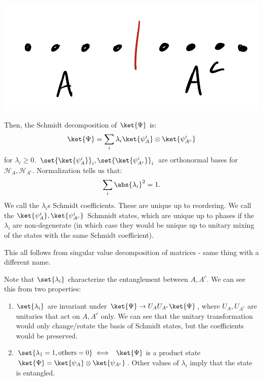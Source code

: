 \begin{center}
    \includegraphics[scale=0.35]{Lectures/Images/lec15-subsystems.png}
\end{center}

Then, the Schmidt decomposition of $\ket{\Psi}$ is:
\begin{equation}
    \ket{\Psi} = \sum_i \lambda_i \ket{\psi^i_A}\otimes \ket{\psi^i_{A^c}}
\end{equation}
for $\lambda_i \geq 0$. $\set{\ket{\psi^i_A}}_i, \set{\ket{\psi^i_{A^c}}}_i$ are orthonormal bases for $\mathcal{H}_A, \mathcal{H}_{A^c}$. Normalization tells us that:
\begin{equation}
    \sum_i \abs{\lambda_i}^2 = 1.
\end{equation}
We call the $\lambda_i$s Schmidt coefficients. These are unique up to reordering. We call the $\ket{\psi^i_A}, \ket{\psi^i_{A^c}}$ Schmnidt states, which are unique up to phases if the $\lambda_i$ are non-degenerate (in which case they would be unique up to unitary mixing of the states with the same Schmidt coefficient).

This all follows from singular value decomposition of matrices - same thing with a different name.

Note that $\set{\lambda_i}$ characterize the entanglement between $A, A^c$. We can see this from two properties:
\begin{enumerate}
    \item $\set{\lambda_i}$ are invariant under $\ket{\Psi} \to U_AU_{A^c}\ket{\Psi}$, where $U_{A}, U_{A^c}$ are unitaries that act on $A, A^c$ only. We can see that the unitary transformation would only change/rotate the basis of Schmidt states, but the coefficients would be preserved.
    \item $\set{\lambda_1 = 1, \text{others} = 0} \iff$ $\ket{\Psi}$ is a product state $\ket{\Psi} = \ket{\psi_A} \otimes \ket{\psi_{A^c}}$. Other values of $\lambda_i$ imply that the state is entangled.
\end{enumerate}

